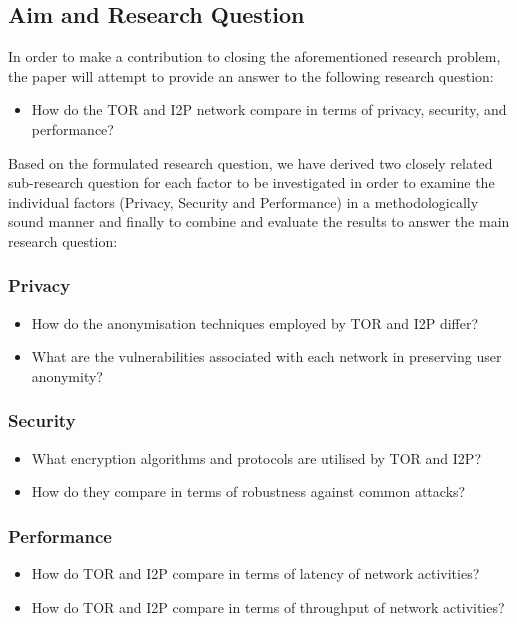 \documentclass[12pt,conference]{IEEEtran}
\begin{document}
\subsection{Aim and Research Question}
In order to make a contribution to closing the aforementioned research problem, the paper will attempt to provide an answer to the following research question:
\begin{itemize}
	\item How do the TOR and I2P network compare in terms of privacy, security, and performance?
\end{itemize}
Based on the formulated research question, we have derived two closely related sub-research question for each factor to be investigated in order to examine the individual factors (Privacy, Security and Performance) in a methodologically sound manner and finally to combine and evaluate the results to answer the main research question:
\subsubsection{Privacy}
\begin{itemize}
	\item How do the anonymisation techniques employed by TOR and I2P differ?
	\item What are the vulnerabilities associated with each network in preserving user anonymity?
\end{itemize}
\subsubsection{Security} 
\begin{itemize}
	\item What encryption algorithms and protocols are utilised by TOR and I2P?
	\item How do they compare in terms of robustness against common attacks? 
\end{itemize}
\subsubsection{Performance} 
\begin{itemize}
	\item How do TOR and I2P compare in terms of latency of network activities?
	\item How do TOR and I2P compare in terms of throughput of network activities?
\end{itemize}
\end{document}
